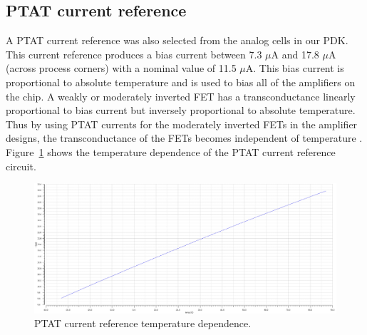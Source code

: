 \documentclass[12pt,oneside,final]{siuethesis}
\theoremstyle{definition}
\begin{document}
\subsection{PTAT current reference}
\par A PTAT current reference was also selected from the analog cells in our PDK. This current reference produces a bias current between 7.3 $\mu$A and 17.8 $\mu$A (across process corners) with a nominal value of 11.5 $\mu$A. This bias current is proportional to absolute temperature and is used to bias all of the amplifiers on the chip. A weakly or moderately inverted FET has a transconductance linearly proportional to bias current but inversely proportional to absolute temperature. Thus by using PTAT currents for the moderately inverted FETs in the amplifier designs, the transconductance of the FETs becomes independent of temperature \cite{ALLEN}. Figure~\ref{fig:ptat} shows the temperature dependence of the PTAT current reference circuit.

\begin{figure}[htbp!]
\centering
\includegraphics[scale=.4,keepaspectratio=true, angle=90]{../data/ptat.png} 
\caption{PTAT current reference temperature dependence.}
\label{fig:ptat}
\end{figure}
\end{document}
